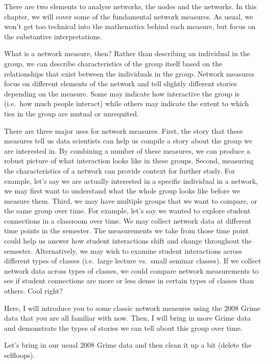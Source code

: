 \documentclass[
  letterpaper,
  DIV=11,
  numbers=noendperiod]{scrreprt}
\begin{document}
There are two elements to analyse networks, the nodes and the networks.
In this chapter, we will cover some of the fundamental network measures.
As usual, we won't get too technical into the mathematics behind each
measure, but focus on the substantive interpretations.

What is a network measure, then? Rather than describing an individual in
the group, we can describe characteristics of the group itself based on
the relationships that exist between the individuals in the group.
Network measures focus on different elements of the network and tell
slightly different stories depending on the measure. Some may indicate
how interactive the group is (i.e.~how much people interact) while
others may indicate the extent to which ties in the group are mutual or
unrequited.

There are three major uses for network measures. First, the story that
these measures tell us data scientists can help us compile a story about
the group we are interested in. By combining a number of these measures,
we can produce a robust picture of what interaction looks like in these
groups. Second, measuring the characteristics of a network can provide
context for further study. For example, let's say we are actually
interested in a specific individual in a network, we may first want to
understand what the whole group looks like before we measure them.
Third, we may have multiple groups that we want to compare, or the same
group over time. For example, let's say we wanted to explore student
connections in a classroom over time. We may collect network data at
different time points in the semester. The measurements we take from
those time point could help us answer how student interactions shift and
change throughout the semester. Alternatively, we may wish to examine
student interactions across different types of classes (i.e.~large
lecture vs.~small seminar classes). If we collect network data across
types of classes, we could compare network measurements to see if
student connections are more or less dense in certain types of classes
than others. Cool right?

Here, I will introduce you to some classic network measures using the
2008 Grime data that you are all familiar with now. Then, I will bring
in more Grime data and demonstrate the types of stories we can tell
about this group over time.

Let's bring in our usual 2008 Grime data and then clean it up a bit
(delete the selfloops).
\end{document}
